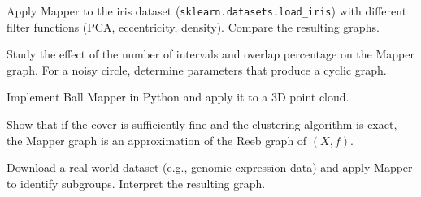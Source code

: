 \begin{exercise}
Apply Mapper to the iris dataset
(\texttt{sklearn.datasets.load\_iris}) with different filter functions
(PCA, eccentricity, density). Compare the resulting graphs.
\end{exercise}

\begin{exercise}
Study the effect of the number of intervals and overlap percentage on
the Mapper graph. For a noisy circle, determine parameters that produce
a cyclic graph.
\end{exercise}

\begin{exercise}
Implement Ball Mapper in Python and apply it to a 3D point cloud.
\end{exercise}

\begin{exercise}
Show that if the cover is sufficiently fine and the clustering algorithm
is exact, the Mapper graph is an approximation of the Reeb graph of
$(X, f)$.
\end{exercise}

\begin{exercise}
Download a real-world dataset (e.g., genomic expression data) and apply
Mapper to identify subgroups. Interpret the resulting graph.
\end{exercise}
